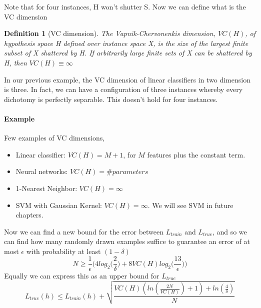 \documentclass[main.tex]{subfiles}
\newtheorem{definition}{Definition}[section]
\begin{document}
Note that for four instances, H won't shutter S.\footnotemark {}
Now we can define what is the VC dimension
\begin{definition}[VC dimension]
    The Vapnik-Chervonenkis dimension, $VC(H)$, of hypothesis space H
    defined over instance space X, is the size of the largest finite subset of X shattered by H. If arbitrarily large finite sets of X can be shattered by H, then $VC(H) \equiv \infty$
\end{definition}
In our previous example, the VC dimension of linear classifiers in two dimension is three. In fact, we can have a configuration of three instances whereby every dichotomy is perfectly separable. This doesn't hold for four instances.
\paragraph{Example} Few examples of VC dimensions,
\begin{itemize}
    \item Linear classifier: $VC(H) = M+1$, for $M$ features plus the constant term.
    \item Neural networks: $VC(H) = \#parameters$
    \item 1-Nearest Neighbor: $VC(H) = \infty$
    \item SVM with Gaussian Kernel: $VC(H) = \infty$. We will see SVM in future chapters.
\end{itemize}
Now we can find a new bound for the error between $L_{train}$ and $L_{true}$, and so we can find how many randomly drawn examples suffice to guarantee an error of at most $\epsilon$ with probability at least $(1-\delta)$
\begin{equation}
    N \geq \frac{1}{\epsilon} \bigg( 4log_2 \bigg( \frac{2}{\delta} \bigg) + 8VC(H) log_2 \bigg( \frac{13}{\epsilon} \bigg) \bigg)
\end{equation}
Equally we can express this as an upper bound for $L_{true}$
\begin{equation}
    L_{true}(h) \leq L_{train}(h) + \sqrt{\frac{VC(H)(ln(\frac{2N}{VC(H)})+1)+ln(\frac{4}{\delta})}{N}}
\end{equation}
\end{document}
